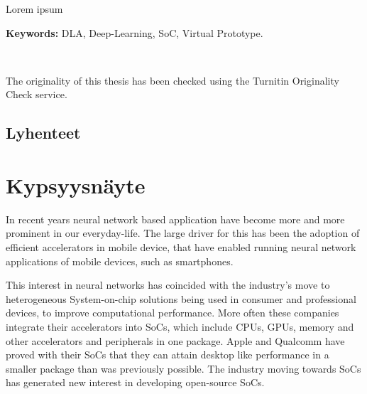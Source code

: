 \documentclass[12pt,a4paper,finnish
]{tunithesis}
\begin{document}
\vspace{0.5cm}


\noindent Lorem ipsum~

\noindent\textbf{Keywords:} DLA, Deep-Learning, SoC, Virtual Prototype.

~

\noindent The originality of this thesis has been checked using the Turnitin Originality Check service.


\clearpage

\section*{Lyhenteet}
\begin{acronym}
\end{acronym}


\clearpage


\setcounter{tocdepth}{3}              %
\tableofcontents                      %

\if@twoside
\cleardoublepage
\fi


\renewcommand{\chaptername}{} %


\chapter{Kypsyysnäyte}
\label{ch:introduction}
\setcounter{page}{1} %

In recent years neural network based application have become more and more prominent in our everyday-life. The large driver for this has been the adoption of efficient accelerators in mobile device, that have enabled running neural network applications of mobile devices, such as smartphones.

This interest in neural networks has coincided with the industry's move to heterogeneous System-on-chip solutions being used in consumer and professional devices, to improve computational performance.
More often these companies integrate their accelerators into SoCs, which include CPUs, GPUs, memory and other accelerators and peripherals in one package. Apple and Qualcomm have proved with their SoCs that they can attain desktop like performance in a smaller package than was previously possible. The industry moving towards SoCs has generated new interest in developing open-source SoCs.
\end{document}
